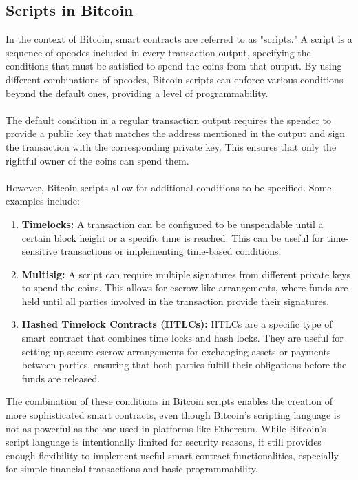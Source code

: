 \subsection{Scripts in Bitcoin}
In the context of Bitcoin, smart contracts are referred to as "scripts." A script is a sequence of opcodes included in every transaction output, specifying the conditions that must be satisfied to spend the coins from that output. By using different combinations of opcodes, Bitcoin scripts can enforce various conditions beyond the default ones, providing a level of programmability.\\\\
The default condition in a regular transaction output requires the spender to provide a public key that matches the address mentioned in the output and sign the transaction with the corresponding private key. This ensures that only the rightful owner of the coins can spend them.\\\\
However, Bitcoin scripts allow for additional conditions to be specified. Some examples include:
\begin{enumerate}
	\item \textbf{Timelocks:} A transaction can be configured to be unspendable until a certain block height or a specific time is reached. This can be useful for time-sensitive transactions or implementing time-based conditions.
	\item \textbf{Multisig:} A script can require multiple signatures from different private keys to spend the coins. This allows for escrow-like arrangements, where funds are held until all parties involved in the transaction provide their signatures.
	\item \textbf{Hashed Timelock Contracts (HTLCs):} HTLCs are a specific type of smart contract that combines time locks and hash locks. They are useful for setting up secure escrow arrangements for exchanging assets or payments between parties, ensuring that both parties fulfill their obligations before the funds are released.
\end{enumerate}
The combination of these conditions in Bitcoin scripts enables the creation of more sophisticated smart contracts, even though Bitcoin's scripting language is not as powerful as the one used in platforms like Ethereum. While Bitcoin's script language is intentionally limited for security reasons, it still provides enough flexibility to implement useful smart contract functionalities, especially for simple financial transactions and basic programmability.
